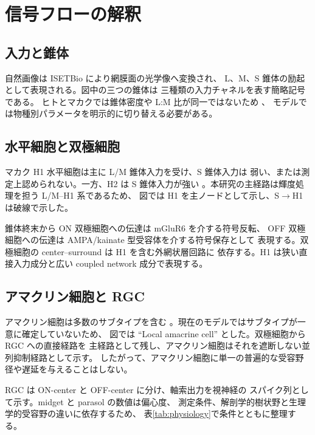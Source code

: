 \documentclass[a4paper,10pt,twocolumn,uplatex,dvipdfmx]{jsarticle}
\begin{document}
\section{信号フローの解釈}

\subsection{入力と錐体}

自然画像は ISETBio により網膜面の光学像へ変換され、
L、M、S 錐体の励起として表現される。図中の三つの錐体は
三種類の入力チャネルを表す簡略記号である。
ヒトとマカクでは錐体密度や L:M 比が同一ではないため
\cite{curcio1990,hofer2005,packer1989,munds2022}、
モデルでは物種別パラメータを明示的に切り替える必要がある。

\subsection{水平細胞と双極細胞}

マカク H1 水平細胞は主に L/M 錐体入力を受け、S 錐体入力は
弱い、または測定上認められない。一方、H2 は S 錐体入力が強い
\cite{dacey1996}。本研究の主経路は輝度処理を担う L/M--H1 系であるため、
図では H1 を主ノードとして示し、S$\rightarrow$H1 は破線で示した。

錐体終末から ON 双極細胞への伝達は mGluR6 を介する符号反転、
OFF 双極細胞への伝達は AMPA/kainate 型受容体を介する符号保存として
表現する。双極細胞の center--surround は H1 を含む外網状層回路に
依存する。H1 は狭い直接入力成分と広い coupled network 成分で表現する。

\newpage
\subsection{アマクリン細胞と RGC}

アマクリン細胞は多数のサブタイプを含む
\cite{masland2012}。現在のモデルではサブタイプが一意に確定していないため、
図では ``Local amacrine cell'' とした。双極細胞から RGC への直接経路を
主経路として残し、アマクリン細胞はそれを遮断しない並列抑制経路として示す。
したがって、アマクリン細胞に単一の普遍的な受容野径や遅延を与えることはしない。

RGC は ON-center と OFF-center に分け、軸索出力を視神経の
スパイク列として示す。midget と parasol の数値は偏心度、
測定条件、解剖学的樹状野と生理学的受容野の違いに依存するため、
表\ref{tab:physiology}で条件とともに整理する。

\clearpage
\onecolumn
\end{document}
